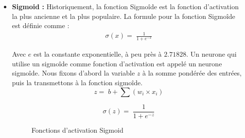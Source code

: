             \begin{itemize}[label=•] 
            \setlength{\itemsep}{5pt}
            
                \item \textbf{Sigmoid :} Historiquement, la fonction Sigmoîde est la fonction d’activation la plus ancienne et la plus populaire. La formule pour la fonction Sigmoîde est définie comme \cite{ch2ref6,ch2ref12} :
                \begin{gather*}
                    \sigma( x ) = \;  \frac{ 1 }{1 + e^{ -x } }
                \end{gather*}
                
                Avec $ e $ est la constante exponentielle, à peu près à $2.71828$. Un neurone qui utilise un sigmoîde comme fonction d’activation est appelé un neurone sigmoîde. Nous fixons d’abord la variable $ z $ à la somme pondérée des entrées, puis la transmettons à la fonction sigmoîde.
                \[ z = \;  b + { \sum{ ( {w_i} \times {x_i} ) } } \]
                
                \begin{equation}
                    \sigma( z ) = \;  \frac{ 1 }{1 + e^{ -z } }
                \end{equation}
                
                
                \begin{figure}[H]
                	\begin{center}
                	\end{center}
                	\caption {Fonctions d'activation Sigmoid}
                	\label{fig:sigmoid}
                \end{figure}         
                

\end{itemize}
